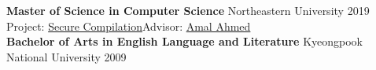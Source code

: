 \documentclass[margin,line]{resume}
\newcommand\mymedskip{10pt}
\begin{document}
\begin{resume}
    \textbf{Master of Science in Computer Science} \hfill Northeastern University 2019\\
    Project: \href{https://github.com/hyeyoungshin/popl19src/blob/master/popl19src.pdf}{Secure Compilation}\hfill Advisor: \href{https://www.khoury.northeastern.edu/home/amal/}{Amal Ahmed}\\[\mymedskip]
    \textbf{Bachelor of Arts in English Language and Literature}  \hfill Kyeongpook National University 2009  %
    


\end{resume}
\end{document}
